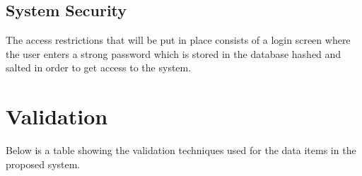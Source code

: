 \subsection{System Security}

\begin{flushleft}
The access restrictions that will be put in place consists of a login screen where the user enters a strong password which is stored in the database hashed and salted in order to get access to the system.
\end{flushleft}

\section{Validation}

\begin{flushleft}
Below is a table showing the validation techniques used for the data items in the proposed system.
\end{flushleft}


